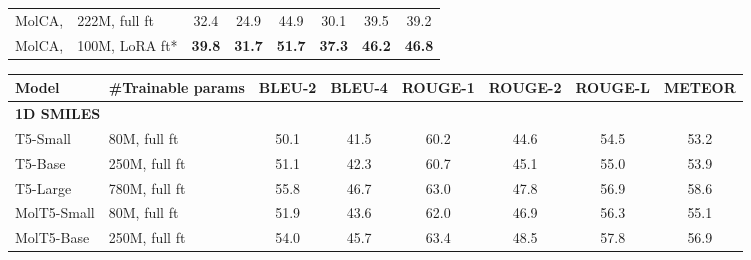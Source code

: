 \documentclass[11pt]{article}
\begin{document}
\begin{table*}[t]
\begin{subtable}[t]{\textwidth}
\begin{tabular}{llcccccc}
    MolCA,     & 222M, full ft                 & 32.4                 & 24.9                 & 44.9                 & 30.1                 & 39.5                 & 39.2                 \\
    MolCA,         & 100M, LoRA ft*                     & \textbf{39.8}        & \textbf{31.7}        & \textbf{51.7}        & \textbf{37.3}        & \textbf{46.2}        & \textbf{46.8}         \\\bottomrule
    \end{tabular}
    \caption{PubChem324k dataset. Baseline performances are reproduced using their source codes~\citep{MolT5, MoMu}.}
    \label{tab:pubchem32k_cap}
    \end{subtable}
    \begin{subtable}[t]{\textwidth}
    \small
    \centering
    \setlength{\tabcolsep}{4pt}
    \begin{tabular}{llcccccc}\toprule
    Model                  & \#Trainable params       & BLEU-2               & BLEU-4               & ROUGE-1              & ROUGE-2              & ROUGE-L              & METEOR               \\\midrule
    \multicolumn{2}{l}{\textbf{1D SMILES}}            & \multicolumn{1}{l}{} & \multicolumn{1}{l}{} & \multicolumn{1}{l}{} & \multicolumn{1}{l}{} & \multicolumn{1}{l}{} & \multicolumn{1}{l}{} \\
    T5-Small               & 80M, full ft                      & 50.1                 & 41.5                 & 60.2                 & 44.6                 & 54.5                 & 53.2                 \\
    T5-Base                & 250M, full ft                     & 51.1                 & 42.3                 & 60.7                 & 45.1                 & 55.0                 & 53.9                 \\
    T5-Large               & 780M, full ft                     & 55.8                 & 46.7                 & 63.0                 & 47.8                 & 56.9                 & 58.6                 \\
    MolT5-Small            & 80M, full ft                      & 51.9                 & 43.6                 & 62.0                 & 46.9                 & 56.3                 & 55.1                 \\
    MolT5-Base             & 250M, full ft                     & 54.0                 & 45.7                 & 63.4                 & 48.5                 & 57.8                 & 56.9                 \\

\end{tabular}
\end{subtable}
\end{table*}
\end{document}
